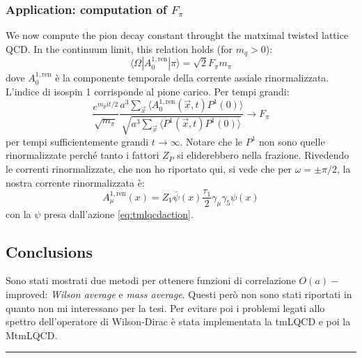 \documentclass[12pt,a4paper,openright]{article}
\newcommand{\la}{\langle}
\newcommand{\ra}{\rangle}
\newcommand{\ren}{{\text{ren}}}
\newcommand{\oai}{$O(a)-$improved}
\begin{document}
\subsubsection*{Application: computation of $F_\pi$}
We now compute the pion decay constant throught the matximal twisted lattice QCD.
In the continuum limit, this relation holds (for $m_q > 0$):
\begin{equation*}
  \la \Omega | A^{1,\ren}_0 | \pi \ra =  \sqrt{2} F_\pi m_\pi
\end{equation*}
dove $A^{1,\ren}_0$ è la componente temporale della corrente assiale rinormalizzata.
L'indice di isospin 1 corrisponde al pione carico.
Per tempi grandi:
\begin{equation*}
  \frac{e^{m_pi t/2}}{\sqrt{m_\pi}} \frac{a^3 \sum_{\vec x} \la A^{1,\ren}_0 (\vec x, t) P^1 (0)\ra}{\sqrt{ a^3 \sum_{\vec x} \la P^1(\vec x, t)P^1 (0) \ra }} \longrightarrow F_\pi
\end{equation*}
per tempi sufficientemente grandi $t\rightarrow \infty$. Notare che le $P^1$ non sono quelle rinormalizzate perché tanto i fattori $Z_P$ si eliderebbero nella frazione.
Rivedendo le correnti rinormalizzate, che non ho riportato qui, si vede che per $\omega = \pm \pi/2$, la nostra corrente rinormalizzata è:
\begin{equation*}
  A_\mu^{1,\ren} (x) = Z_V \bar\psi (x) \frac{\tau_1}{2} \gamma_\mu \gamma_5 \psi (x)
\end{equation*}
con la $\psi$ presa dall'azione \ref{eq:tmlqcdaction}. 

\subsection{Conclusions}
Sono stati mostrati due metodi per ottenere funzioni di correlazione \oai: \textit{Wilson average} e \textit{mass average}.
Questi però non sono stati riportati in quanto non mi interessano per la tesi.
\newline
Per evitare poi i problemi legati allo spettro dell'operatore di Wilson-Dirac è stata implementata la tmLQCD e poi la MtmLQCD.
\newline
\hrule
\end{document}
